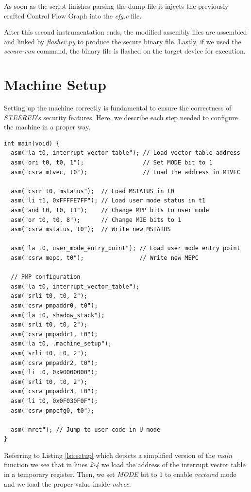 As soon as the script finishes parsing the dump file it injects the previously crafted
Control Flow Graph into the \textit{cfg.c} file.

After this second instrumentation ends, the modified assembly files are assembled
and linked by \textit{flasher.py} to produce the secure binary file. Lastly, if
we used the \textit{secure-run} command, the binary file is flashed on the
target device for execution.

\section{Machine Setup}
\label{sec:project_setup}

Setting up the machine correctly is fundamental to ensure the correctness of \textit{STEERED}'s
security features. Here, we describe each step needed to configure the machine
in a proper way.

\begin{lstlisting}[style=CStyle, caption = Machine setup, label={lst:setup}]
int main(void) {
  asm("la t0, interrupt_vector_table"); // Load vector table address
  asm("ori t0, t0, 1");                 // Set MODE bit to 1
  asm("csrw mtvec, t0");                // Load the address in MTVEC

  asm("csrr t0, mstatus");  // Load MSTATUS in t0
  asm("li t1, 0xFFFFE7FF"); // Load user mode status in t1
  asm("and t0, t0, t1");    // Change MPP bits to user mode
  asm("or t0, t0, 8");      // Change MIE bits to 1
  asm("csrw mstatus, t0");  // Write new MSTATUS

  asm("la t0, user_mode_entry_point"); // Load user mode entry point
  asm("csrw mepc, t0");                // Write new MEPC

  // PMP configuration
  asm("la t0, interrupt_vector_table");
  asm("srli t0, t0, 2");
  asm("csrw pmpaddr0, t0");
  asm("la t0, shadow_stack");
  asm("srli t0, t0, 2");
  asm("csrw pmpaddr1, t0");
  asm("la t0, .machine_setup");
  asm("srli t0, t0, 2");
  asm("csrw pmpaddr2, t0");
  asm("li t0, 0x90000000");
  asm("srli t0, t0, 2");
  asm("csrw pmpaddr3, t0");
  asm("li t0, 0x0F030F0F");
  asm("csrw pmpcfg0, t0");

  asm("mret"); // Jump to user code in U mode
}
\end{lstlisting}

Referring to Listing \ref{lst:setup} which depicts a simplified version of the \textit{main}
function we see that in lines \textit{2-4} we load the address of the interrupt vector
table in a temporary register. Then, we set \textit{MODE} bit to $1$ to enable
\textit{vectored} mode and we load the proper value inside \textit{mtvec}.

